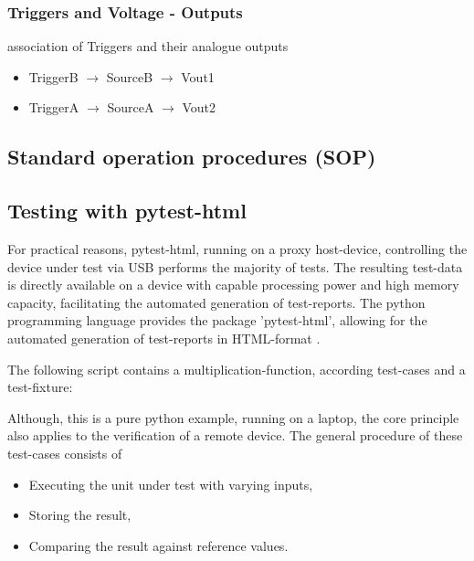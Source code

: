 	\subsubsection{Triggers and Voltage - Outputs}
	association of Triggers and their analogue outputs
	\begin{itemize}
		\item TriggerB $\rightarrow$ SourceB $\rightarrow$ Vout1
		\item TriggerA $\rightarrow$ SourceA $\rightarrow$ Vout2
	\end{itemize}



	\subsection{Standard operation procedures (SOP)}
	{	\scriptsize
		
	}

	\subsection{Testing with pytest-html}
		For practical reasons, pytest-html, running on a proxy host-device, controlling the device under test via USB performs the majority of tests. The resulting test-data is directly available on a device with capable processing power and high memory capacity, facilitating the automated generation of test-reports. The python programming language provides the package 'pytest-html', allowing for the automated generation of test-reports in HTML-format \cite{Pajankar2021pytest}.

			The following script contains a multiplication-function, according test-cases and a test-fixture:
		
		Although, this is a pure python example, running on a laptop, the core principle also applies to the verification of a remote device. The general procedure of these test-cases consists of 
		\begin{itemize} \setlength\itemsep{1px}
		\item Executing the unit under test with varying inputs,
		\item Storing the result,
		\item Comparing the result against reference values.
		\end{itemize}
		
